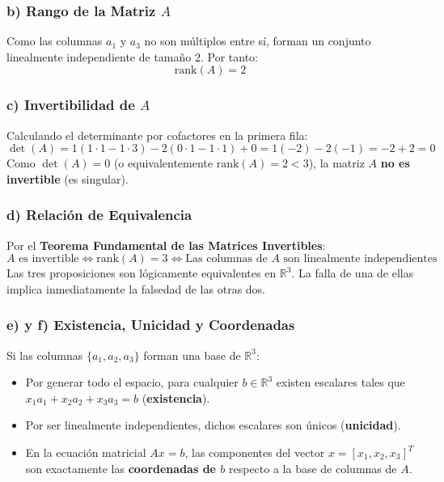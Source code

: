 \documentclass[11pt,a4paper]{article}
\theoremstyle{definition}
\theoremstyle{remark}
\begin{document}
\subsubsection{b) Rango de la Matriz $A$}
Como las columnas $a_1$ y $a_3$ no son múltiplos entre sí, forman un conjunto linealmente independiente de tamaño 2. Por tanto:
\begin{equation}
    \text{rank}(A) = 2
\end{equation}

\subsubsection{c) Invertibilidad de $A$}
Calculando el determinante por cofactores en la primera fila:
\begin{equation}
    \det(A) = 1(1\cdot 1 - 1\cdot 3) - 2(0\cdot 1 - 1\cdot 1) + 0 = 1(-2) - 2(-1) = -2 + 2 = 0
\end{equation}
Como $\det(A) = 0$ (o equivalentemente $\text{rank}(A) = 2 < 3$), la matriz $A$ \textbf{no es invertible} (es singular).

\subsubsection{d) Relación de Equivalencia}
Por el \textbf{Teorema Fundamental de las Matrices Invertibles}:
\begin{equation}
    A \text{ es invertible} \iff \text{rank}(A) = 3 \iff \text{Las columnas de } A \text{ son linealmente independientes}
\end{equation}
Las tres proposiciones son lógicamente equivalentes en $\mathbb{R}^3$. La falla de una de ellas implica inmediatamente la falsedad de las otras dos.

\subsubsection{e) y f) Existencia, Unicidad y Coordenadas}
Si las columnas $\{a_1, a_2, a_3\}$ forman una base de $\mathbb{R}^3$:
\begin{itemize}[leftmargin=*]
    \item Por generar todo el espacio, para cualquier $b \in \mathbb{R}^3$ existen escalares tales que $x_1 a_1 + x_2 a_2 + x_3 a_3 = b$ (\textbf{existencia}).
    \item Por ser linealmente independientes, dichos escalares son únicos (\textbf{unicidad}).
    \item En la ecuación matricial $Ax = b$, las componentes del vector $x = [x_1, x_2, x_3]^T$ son exactamente las \textbf{coordenadas de $b$} respecto a la base de columnas de $A$.
\end{itemize}
\end{document}
